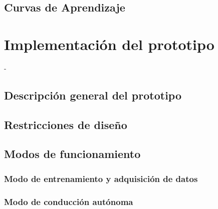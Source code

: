     \subsection{Curvas de Aprendizaje}

\section{Implementación del prototipo}
- 
    \subsection{Descripción general del prototipo}
    \subsection{Restricciones de diseño}
    \subsection{Modos de funcionamiento}
        \subsubsection{Modo de entrenamiento y adquisición de datos}
        \subsubsection{Modo de conducción autónoma}
        